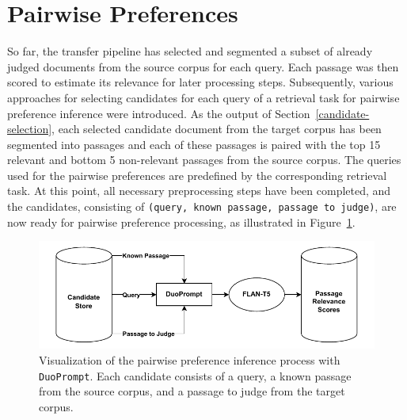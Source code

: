 \section{Pairwise Preferences}\label{pairwise-preferences}

So far, the transfer pipeline has selected and segmented a subset of already judged documents from the source corpus for each query. Each passage was then scored to estimate its relevance for later processing steps. Subsequently, various approaches for selecting candidates for each query of a retrieval task for pairwise preference inference were introduced. As the output of Section~\ref{candidate-selection}, each selected candidate document from the target corpus has been segmented into passages and each of these passages is paired with the top 15 relevant and bottom 5 non-relevant passages from the source corpus. The queries used for the pairwise preferences are predefined by the corresponding retrieval task. At this point, all necessary preprocessing steps have been completed, and the candidates, consisting of \texttt{(query, known passage, passage to judge)}, are now ready for pairwise preference processing, as illustrated in Figure~\ref{fig:pairwise-preferences}.
\pagebreak

\begin{figure}[t]
    \centering
    \includegraphics[width=\textwidth]{./graphics/drawio/pairwise_preferences.pdf}
    \caption{Visualization of the pairwise preference inference process with \texttt{DuoPrompt}. Each candidate consists of a query, a known passage from the source corpus, and a passage to judge from the target corpus.}
    \label{fig:pairwise-preferences}
\end{figure}

